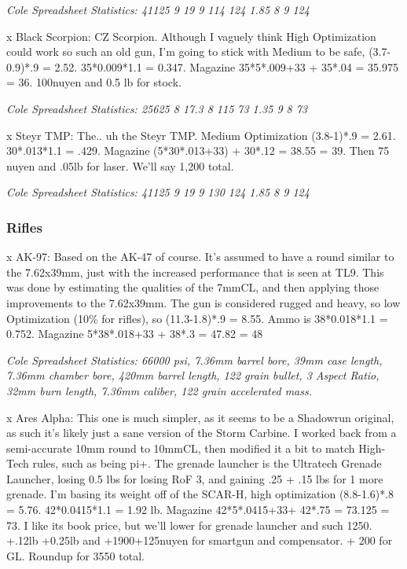 \begin{multicols*}{2}
	\textit{\textcolor{OliveGreen}{Cole Spreadsheet Statistics: 41125 9 19 9 114 124 1.85 8 9 124}}
	
	x Black Scorpion: CZ Scorpion. Although I vaguely think High Optimization could work so such an old gun, I'm going to stick with Medium to be safe, (3.7-0.9)*.9 = 2.52. 35*0.009*1.1 = 0.347. Magazine 35*5*.009+33 + 35*.04 = 35.975 = 36. 100nuyen and 0.5 lb for stock.
	
	\textit{\textcolor{OliveGreen}{Cole Spreadsheet Statistics: 25625 8 17.3 8 115 73 1.35 9 8 73}}
	
	x Steyr TMP: The.. uh the Steyr TMP. Medium Optimization (3.8-1)*.9 = 2.61. 30*.013*1.1 = .429. Magazine (5*30*.013+33) + 30*.12 = 38.55 = 39. Then 75 nuyen and .05lb for laser. We'll say 1,200 total.
	
	\textit{\textcolor{OliveGreen}{Cole Spreadsheet Statistics: 41125 9 19 9 130 124 1.85 8 9 124}}
	
	\subsubsection{Rifles}
	
	x AK-97: Based on the AK-47 of course. It's assumed to have a round similar to the 7.62x39mm, just with the increased performance that is seen at TL9. This was done by estimating the qualities of the 7mmCL, and then applying those improvements to the 7.62x39mm. The gun is considered rugged and heavy, so low Optimization (10\% for rifles), so (11.3-1.8)*.9 = 8.55. Ammo is 38*0.018*1.1 = 0.752. Magazine 5*38*.018+33 + 38*.3 = 47.82 = 48
	
	\textit{\textcolor{OliveGreen}{Cole Spreadsheet Statistics: 66000 psi, 7.36mm barrel bore, 39mm case length, 7.36mm chamber bore, 420mm barrel length, 122 grain bullet, 3 Aspect Ratio, 32mm burn length, 7.36mm caliber, 122 grain accelerated mass.}}
	
	x Ares Alpha: This one is much simpler, as it seems to be a Shadowrun original, as such it's likely just a sane version of the Storm Carbine. I worked back from a semi-accurate 10mm round to 10mmCL, then modified it a bit to match High-Tech rules, such as being pi+. The grenade launcher is the Ultratech Grenade Launcher, losing 0.5 lbs for losing RoF 3, and gaining .25 + .15 lbs for 1 more grenade. I'm basing its weight off of the SCAR-H, high optimization (8.8-1.6)*.8 = 5.76. 42*0.0415*1.1 = 1.92 lb. Magazine 42*5*.0415+33+ 42*.75 = 73.125 = 73. I like its book price, but we'll lower for grenade launcher and such 1250. +.12lb +0.25lb and +1900+125nuyen for smartgun and compensator. + 200 for GL. Roundup for 3550 total.
	

\end{multicols*}
